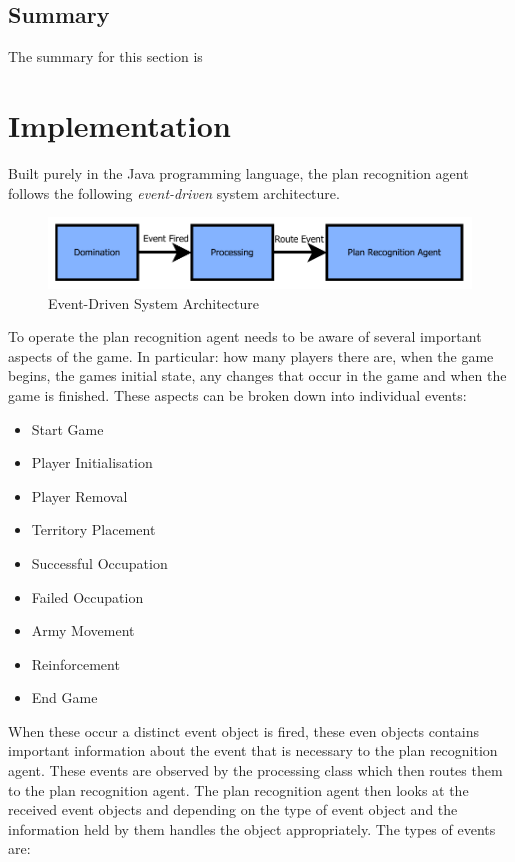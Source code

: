 \documentclass[parskip]{cs4rep}
\begin{document}
\section{Summary}

The summary for this section is

\chapter{Implementation}

Built purely in the Java programming language, the plan recognition agent follows the following \textit{event-driven} system architecture.

\begin{figure}[h]
\centering
\includegraphics{images/event-architecture_cropped}
\caption{Event-Driven System Architecture}
\end{figure} 

To operate the plan recognition agent needs to be aware of several important aspects of the game. In particular: how many players there are, when the game begins, the games initial state, any changes that occur in the game and when the game is finished. These aspects can be broken down into individual events:

\begin{itemize}
\item
Start Game
\item
Player Initialisation
\item
Player Removal
\item
Territory Placement
\item
Successful Occupation
\item
Failed Occupation
\item
Army Movement
\item
Reinforcement
\item
End Game
\end{itemize}

When these occur a distinct event object is fired, these even objects contains important information about the event that is necessary to the plan recognition agent. These events are observed by the processing class which then routes them to the plan recognition agent. The plan recognition agent then looks at the received event objects and depending on the type of event object and the information held by them handles the object appropriately. The types of events are:
\end{document}
